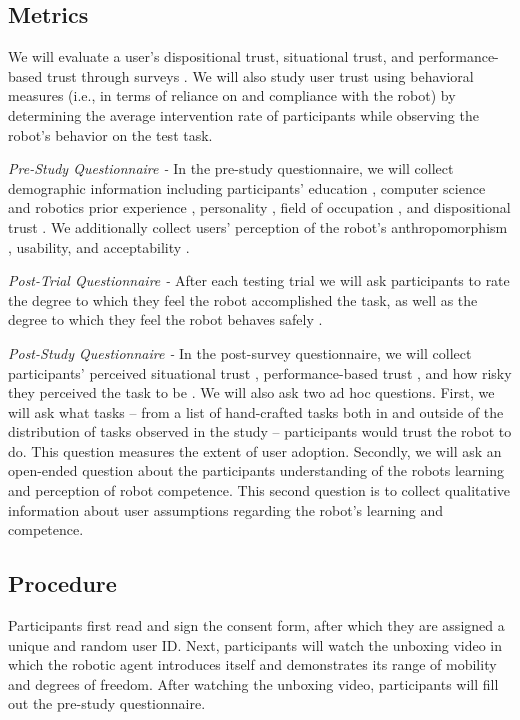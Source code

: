 \documentclass[letterpaper]{article} %
\begin{document}
\subsection{Metrics}
\label{sec:metrics}
We will evaluate a user's dispositional trust, situational trust, and performance-based trust through surveys \cite{merritt_i_2013, jian_foundations_2000, malle_multidimensional_2021}. We will also study user trust using behavioral measures (i.e., in terms of reliance on and compliance with the robot) by determining the average intervention rate of participants while observing the robot's behavior on the test task.

\textit{Pre-Study Questionnaire -} In the pre-study questionnaire, we will collect demographic information including participants' education \cite{raub_correlates_nodate}, computer science and robotics prior experience \cite{raub_correlates_nodate}, personality \cite{donnellan_mini-ipip_2006}, field of occupation \cite{noauthor_college_nodate}, and dispositional trust \cite{merritt_i_2013}. We additionally collect users' perception of the robot's anthropomorphism \cite{bartneck_measurement_2009}, usability, and acceptability \cite{belanche_integrating_2012}.

\textit{Post-Trial Questionnaire -}
After each testing trial we will ask participants to rate the degree to which they feel the robot accomplished the task, as well as the degree to which they feel the robot behaves safely \cite{bartneck_measurement_2009}.

\textit{Post-Study Questionnaire -}
In the post-survey questionnaire, we will collect participants' perceived situational trust \cite{jian_foundations_2000}, performance-based trust \cite{malle_multidimensional_2021}, and how risky they perceived the task to be \cite{fischhoff_how_1978}. We will also ask two ad hoc questions. First, we will ask what tasks -- from a list of hand-crafted tasks both in and outside of the distribution of tasks observed in the study -- participants would trust the robot to do. This question measures the extent of user adoption. Secondly, we will ask an open-ended question about the participants understanding of the robots learning and perception of robot competence. This second question is to collect qualitative information about user assumptions regarding the robot's learning and competence.

\subsection{Procedure}
\label{sec:procedure}
Participants first read and sign the consent form, after which they are assigned a unique and random user ID. Next, participants will watch the unboxing video in which the robotic agent introduces itself and demonstrates its range of mobility and degrees of freedom. After watching the unboxing video, participants will fill out the pre-study questionnaire.
\end{document}
